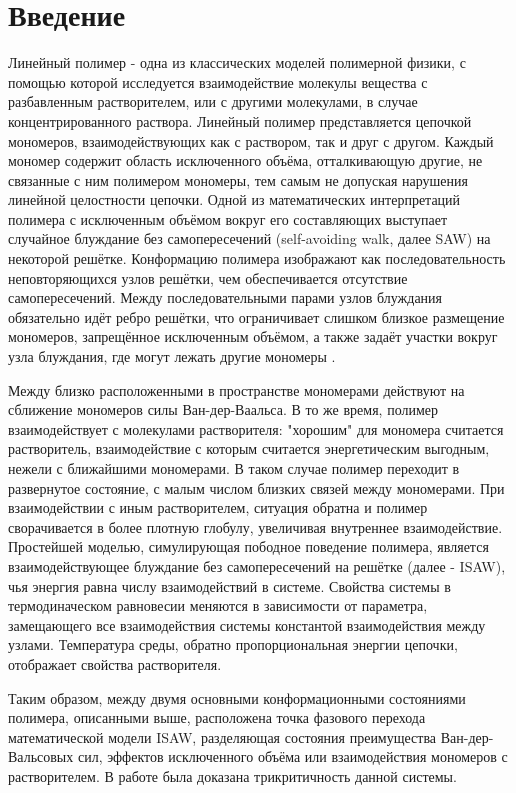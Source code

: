 \section{Введение}

\setcounter{page}{1}

Линейный полимер - одна из классических моделей полимерной физики, 
с помощью которой исследуется взаимодействие молекулы вещества с разбавленным растворителем, 
или с другими молекулами, в случае концентрированного раствора.
Линейный полимер представляется цепочкой мономеров, взаимодействующих как с раствором, так и друг с другом.
Каждый мономер содержит область исключенного объёма, отталкивающую другие, не связанные с ним полимером мономеры, 
тем самым не допуская нарушения линейной целостности цепочки.
Одной из математических интерпретаций полимера с исключенным объёмом вокруг его составляющих выступает случайное блуждание без самопересечений (self-avoiding walk, далее SAW) на некоторой решётке.
Конформацию полимера изображают как последовательность неповторяющихся узлов решётки, чем обеспечивается отсутствие самопересечений.
Между последовательными парами узлов блуждания обязательно идёт ребро решётки, что ограничивает слишком близкое размещение мономеров, запрещённое исключенным объёмом, а также задаёт участки вокруг узла блуждания, где могут лежать другие мономеры \cite{Gennes1979, Vanderzande1998}.

Между близко расположенными в пространстве мономерами действуют на сближение мономеров
силы Ван-дер-Ваальса.
В то же время, полимер взаимодействует с молекулами растворителя:
"хорошим" для мономера считается растворитель, взаимодействие с которым считается энергетическим выгодным, нежели с ближайшими мономерами.
В таком случае полимер переходит в развернутое состояние, с малым числом близких связей между мономерами.
При взаимодействии с иным растворителем, ситуация обратна и полимер сворачивается в более плотную глобулу, увеличивая внутреннее взаимодействие.
Простейшей моделью, симулирующая пободное поведение полимера, является взаимодействующее блуждание без самопересечений на решётке
(далее - ISAW), чья энергия равна числу взаимодействий в системе. 
Свойства системы в термодиначеском равновесии меняются в зависимости от параметра, замещающего все взаимодействия системы константой взаимодействия между узлами.
Температура среды, обратно пропорциональная энергии цепочки, отображает свойства растворителя.

Таким образом, между двумя основными конформационными состояниями полимера, описанными выше, 
расположена точка фазового перехода математической модели ISAW, разделяющая состояния преимущества Ван-дер-Вальсовых сил, эффектов исключенного объёма или взаимодействия мономеров с растворителем.
В работе \cite{Gennes1979} была доказана трикритичность данной системы.

